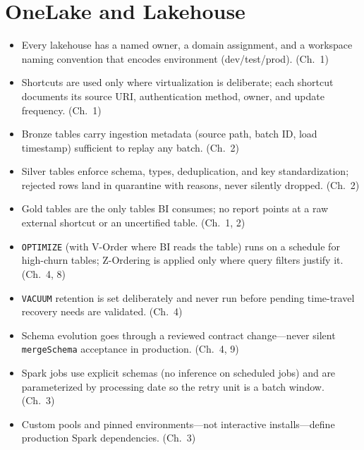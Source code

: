 \section{OneLake and Lakehouse}
%
\begin{itemize}
    \item[$\square$] Every lakehouse has a named owner, a domain assignment, and a workspace
    naming convention that encodes environment (dev/test/prod). (Ch.~1)
    \item[$\square$] Shortcuts are used only where virtualization is deliberate; each shortcut
    documents its source URI, authentication method, owner, and update frequency. (Ch.~1)
    \item[$\square$] Bronze tables carry ingestion metadata (source path, batch ID, load
    timestamp) sufficient to replay any batch. (Ch.~2)
    \item[$\square$] Silver tables enforce schema, types, deduplication, and key
    standardization; rejected rows land in quarantine with reasons, never silently dropped. (Ch.~2)
    \item[$\square$] Gold tables are the only tables BI consumes; no report points at a raw
    external shortcut or an uncertified table. (Ch.~1, 2)
    \item[$\square$] \texttt{OPTIMIZE} (with V-Order where BI reads the table) runs on a
    schedule for high-churn tables; Z-Ordering is applied only where query filters justify
    it. (Ch.~4, 8)
    \item[$\square$] \texttt{VACUUM} retention is set deliberately and never run before pending
    time-travel recovery needs are validated. (Ch.~4)
    \item[$\square$] Schema evolution goes through a reviewed contract change---never silent
    \texttt{mergeSchema} acceptance in production. (Ch.~4, 9)
    \item[$\square$] Spark jobs use explicit schemas (no inference on scheduled jobs) and are
    parameterized by processing date so the retry unit is a batch window. (Ch.~3)
    \item[$\square$] Custom pools and pinned environments---not interactive installs---define
    production Spark dependencies. (Ch.~3)
\end{itemize}

